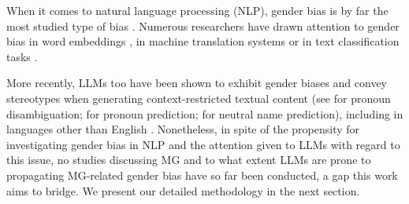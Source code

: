 When it comes to natural language processing (NLP), gender bias is by far the most studied type of bias \citep{ducelRechercheBiaisDans2024}. Numerous researchers have drawn attention to gender bias in word embeddings \citep{bolukbasiManComputerProgrammer2016}, in machine translation systems \citep{savoldiGenderBiasMachine2021,wisniewskiBiaisGenreDans2021} or in text classification tasks \citep{sobhaniFairerNLPModels2024}.

More recently, LLMs too have been shown to exhibit gender biases and convey stereotypes when generating context-restricted textual content (see \citet{kotekGenderBiasStereotypes2023} for pronoun disambiguation; \citet{dollEvaluatingGenderBias2024} for pronoun prediction; \citet{youBinaryGenderLabels2024} for neutral name prediction), including in languages other than English \citep{zhaoGenderBiasLarge2024,ducelEvaluationAutomatiqueBiais2024}. Nonetheless, in spite of the propensity for investigating gender bias in NLP and the attention given to LLMs with regard to this issue, no studies discussing MG and to what extent LLMs are prone to propagating MG-related gender bias have so far been conducted, a gap this work aims to bridge. We present our detailed methodology in the next section.